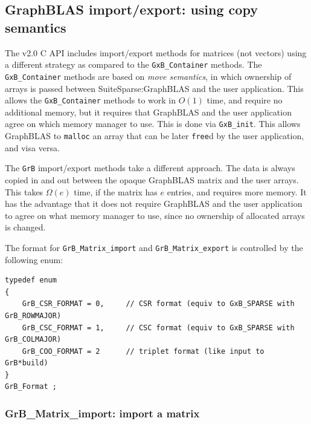 
\newpage
\subsection{GraphBLAS import/export: using copy semantics} %
\label{GrB_import_export}

The v2.0 C API includes import/export methods for matrices (not vectors) using
a different strategy as compared to the \verb'GxB_Container' methods.  The
\verb'GxB_Container' methods are based on {\em move semantics}, in which
ownership of arrays is passed between SuiteSparse:GraphBLAS and the user
application.  This allows the \verb'GxB_Container' methods to work in $O(1)$
time, and require no additional memory, but it requires that GraphBLAS and the
user application agree on which memory manager to use.  This is done via
\verb'GxB_init'.  This allows GraphBLAS to \verb'malloc' an array that can be
later \verb'free'd by the user application, and visa versa.

The \verb'GrB' import/export methods take a different approach.  The data
is always copied in and out between the opaque GraphBLAS matrix and the
user arrays.  This takes $\Omega(e)$ time, if the matrix has $e$ entries,
and requires more memory.  It has the advantage that it does not require
GraphBLAS and the user application to agree on what memory manager to use,
since no ownership of allocated arrays is changed.

The format for \verb'GrB_Matrix_import' and \verb'GrB_Matrix_export' is
controlled by the following enum:

{\footnotesize
\begin{verbatim}
typedef enum
{
    GrB_CSR_FORMAT = 0,     // CSR format (equiv to GxB_SPARSE with GrB_ROWMAJOR)
    GrB_CSC_FORMAT = 1,     // CSC format (equiv to GxB_SPARSE with GrB_COLMAJOR)
    GrB_COO_FORMAT = 2      // triplet format (like input to GrB*build)
}
GrB_Format ; \end{verbatim}}

\newpage
\subsubsection{{\sf GrB\_Matrix\_import:}  import a matrix}
\label{GrB_matrix_import}

